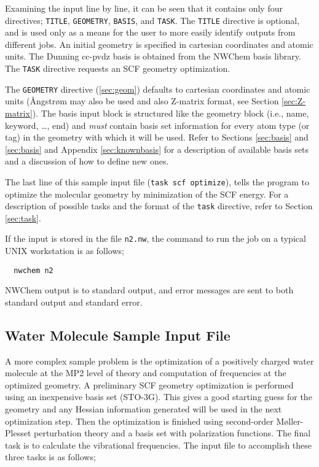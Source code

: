 Examining the input line by line, it can be seen that it contains
only four directives; \verb+TITLE+, \verb+GEOMETRY+, \verb+BASIS+, and
\verb+TASK+.  The \verb+TITLE+ directive is optional, and is used only
as a means for the user to more easily identify outputs from different
jobs.  An initial geometry is specified in cartesian coordinates and
atomic units.  The Dunning cc-pvdz basis is obtained from the NWChem
basis library.  The \verb+TASK+ directive requests an SCF geometry
optimization.

The \verb+GEOMETRY+ directive (\ref{sec:geom}) defaults to cartesian
coordinates and atomic units ({\AA}ngstr{\o}m may also be used and
also Z-matrix format, see Section \ref{sec:Z-matrix}).  The basis
input block is structured like the geometry block (i.e., name,
keyword, \ldots, end) and {\em must} contain basis set information for
every atom type (or tag) in the geometry with which it will be used.
Refer to Sections \ref{sec:basis} and \ref{sec:basis} and Appendix
\ref{sec:knownbasis} for a description of available basis sets and a
discussion of how to define new ones.

The last line of this sample input file ({\tt task scf optimize}),
tells the program to optimize the molecular geometry by minimization
of the SCF energy.  For a description of possible tasks and the format
of the {\tt task} directive, refer to Section \ref{sec:task}.

If the input is stored in the file \verb+n2.nw+, the command to run
the job on a typical UNIX workstation is as follows;

\begin{verbatim}
  nwchem n2
\end{verbatim}

NWChem output is to standard output, and error messages are sent to
both standard output and standard error.

\subsection{Water Molecule Sample Input File}
\label{sec:realsample}

A more complex sample problem is the optimization of a positively
charged water molecule at the MP2 level of theory and computation of
frequencies at the optimized geometry.  A preliminary SCF geometry
optimization is performed using an inexpensive basis set (STO-3G).
This gives a good starting guess for the geometry and any Hessian
information generated will be used in the next optimization step.
Then the optimization is finished using second-order M{\o}ller-Plesset
perturbation theory and a basis set with polarization functions.  The
final task is to calculate the vibrational frequencies.  The input
file to accomplish these three tasks is as follows;

